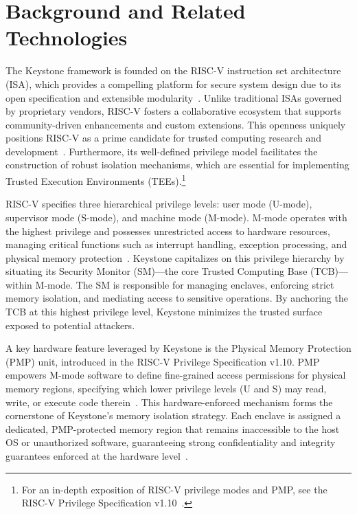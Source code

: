\chapter{Background and Related Technologies}
\label{chap:background}

The Keystone framework is founded on the RISC-V instruction set architecture (ISA), which provides a compelling platform for secure system design due to its open specification and extensible modularity~\cite{lee2019keystone,dayeol2019keystone}. Unlike traditional ISAs governed by proprietary vendors, RISC-V fosters a collaborative ecosystem that supports community-driven enhancements and custom extensions. This openness uniquely positions RISC-V as a prime candidate for trusted computing research and development~\cite{Survey2023}. Furthermore, its well-defined privilege model facilitates the construction of robust isolation mechanisms, which are essential for implementing Trusted Execution Environments (TEEs).\footnote{For an in-depth exposition of RISC-V privilege modes and PMP, see the RISC-V Privilege Specification v1.10~\cite{keystone2025how}.}

RISC-V specifies three hierarchical privilege levels: user mode (U-mode), supervisor mode (S-mode), and machine mode (M-mode). M-mode operates with the highest privilege and possesses unrestricted access to hardware resources, managing critical functions such as interrupt handling, exception processing, and physical memory protection~\cite{lee2019keystone}. Keystone capitalizes on this privilege hierarchy by situating its Security Monitor (SM)—the core Trusted Computing Base (TCB)—within M-mode. The SM is responsible for managing enclaves, enforcing strict memory isolation, and mediating access to sensitive operations. By anchoring the TCB at this highest privilege level, Keystone minimizes the trusted surface exposed to potential attackers.

A key hardware feature leveraged by Keystone is the Physical Memory Protection (PMP) unit, introduced in the RISC-V Privilege Specification v1.10. PMP empowers M-mode software to define fine-grained access permissions for physical memory regions, specifying which lower privilege levels (U and S) may read, write, or execute code therein~\cite{keystone2025how}. This hardware-enforced mechanism forms the cornerstone of Keystone’s memory isolation strategy. Each enclave is assigned a dedicated, PMP-protected memory region that remains inaccessible to the host OS or unauthorized software, guaranteeing strong confidentiality and integrity guarantees enforced at the hardware level~\cite{lee2019keystone}.

